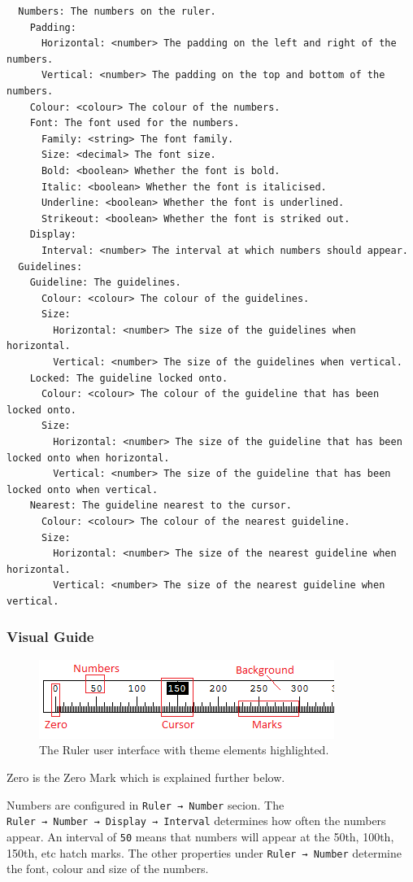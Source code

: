 \documentclass[
]{book}
\begin{document}
\begin{verbatim}
  Numbers: The numbers on the ruler.
    Padding:
      Horizontal: <number> The padding on the left and right of the numbers.
      Vertical: <number> The padding on the top and bottom of the numbers.
    Colour: <colour> The colour of the numbers.
    Font: The font used for the numbers.
      Family: <string> The font family.
      Size: <decimal> The font size.
      Bold: <boolean> Whether the font is bold.
      Italic: <boolean> Whether the font is italicised.
      Underline: <boolean> Whether the font is underlined.
      Strikeout: <boolean> Whether the font is striked out.
    Display:
      Interval: <number> The interval at which numbers should appear.
  Guidelines:
    Guideline: The guidelines.
      Colour: <colour> The colour of the guidelines.
      Size:
        Horizontal: <number> The size of the guidelines when horizontal.
        Vertical: <number> The size of the guidelines when vertical.
    Locked: The guideline locked onto.
      Colour: <colour> The colour of the guideline that has been locked onto.
      Size:
        Horizontal: <number> The size of the guideline that has been locked onto when horizontal.
        Vertical: <number> The size of the guideline that has been locked onto when vertical.
    Nearest: The guideline nearest to the cursor.
      Colour: <colour> The colour of the nearest guideline.
      Size:
        Horizontal: <number> The size of the nearest guideline when horizontal.
        Vertical: <number> The size of the nearest guideline when vertical.
\end{verbatim}

\hypertarget{visual-guide}{%
\subsubsection{Visual Guide}\label{visual-guide}}

\begin{figure}
\centering
\includegraphics{images/ruler-theme.png}
\caption{\label{fig:unnamed-chunk-4}The Ruler user interface with theme elements highlighted.}
\end{figure}

Zero is the Zero Mark which is explained further below.

Numbers are configured in \texttt{Ruler\ →\ Number} secion.
The \texttt{Ruler\ →\ Number\ →\ Display\ →\ Interval} determines how often the numbers appear.
An interval of \texttt{50} means that numbers will appear at the 50th, 100th, 150th, etc hatch marks.
The other properties under \texttt{Ruler\ →\ Number} determine the font, colour and size of the numbers.
\end{document}
